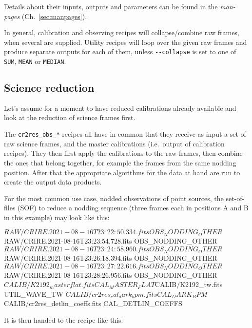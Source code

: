 Details about their inputs, outputs and parameters can be found in the
\emph{man-pages} (Ch.~\ref{sec:manpages}).

In general, calibration and observing recipes will collapse/combine raw frames,
when several are supplied. Utility recipes will loop over the given raw frames
and produce separate outputs for each of them, unless \verb!--collapse! is
set to one of \verb!SUM!, \verb!MEAN! or \verb!MEDIAN!.



\subsection{Science reduction}
\label{sec:sci-reduc}
Let's assume for a moment to have reduced calibrations already available
and look at the reduction of science frames first.

The \texttt{cr2res\_obs\_*} recipes all have in common that they receive as
input a set of raw science frames, and the master calibrations (i.e.~output of
calibration recipes). They then first apply the calibrations to the raw frames,
then combine the ones that belong together, for example the frames from the same
nodding position. After that the appropriate algorithms for the data at hand are
run to create the output data products.

For the most common use case, nodded observations of point sources, the
set-of-files (SOF) to reduce a nodding sequence (three frames each in positions
A and B in this example) may look like this:
\begin{shell}[fontsize=\small]
$RAW/CRIRE.2021-08-16T23:22:50.334.fits OBS_NODDING_OTHER
$RAW/CRIRE.2021-08-16T23:23:54.728.fits OBS_NODDING_OTHER
$RAW/CRIRE.2021-08-16T23:24:58.960.fits OBS_NODDING_OTHER
$RAW/CRIRE.2021-08-16T23:26:18.394.fits OBS_NODDING_OTHER
$RAW/CRIRE.2021-08-16T23:27:22.616.fits OBS_NODDING_OTHER
$RAW/CRIRE.2021-08-16T23:28:26.956.fits OBS_NODDING_OTHER
$CALIB/K2192_masterflat.fits           CAL_MASTER_FLAT
$CALIB/K2192_tw.fits                   UTIL_WAVE_TW
$CALIB/cr2res_cal_dark_bpm.fits        CAL_DARK_BPM
$CALIB/cr2res_detlin_coeffs.fits       CAL_DETLIN_COEFFS
\end{shell}

It is then handed to the recipe like this:
\begin{shell}[fontsize=\small]
\end{shell}

